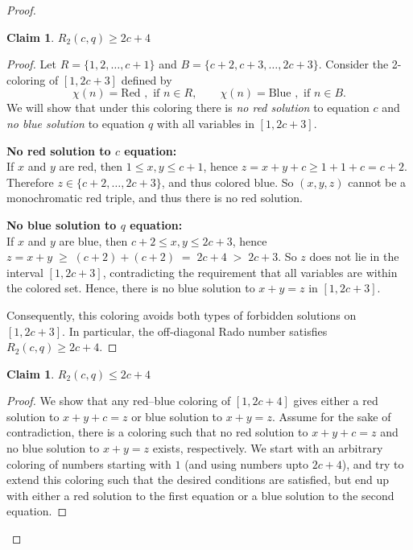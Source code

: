 \documentclass[preprint,12pt]{elsarticle}
\theoremstyle{plain}
\theoremstyle{definition}
\newtheorem{claim}[thm]{Claim}
\begin{document}
\begin{proof}
\begin{claim}\label{clm3.1}
    $R_2(c,q) \geq 2c+4$
\end{claim}
\begin{proof} Let $R = \{1,2,\dots,c+1\}$ and $B = \{c+2,c+3,\dots,2c+3\}$. Consider the 2-coloring of $[1,2c+3]$ defined by
$$
\chi(n) = \text{Red }, \text{ if $n \in R$},
\qquad
\chi(n) = \text{Blue }, \text{ if $n \in B$}.
$$
We will show that under this coloring there is
\emph{no red solution} to equation $c$ and \emph{no blue solution} to equation $q$ with all variables in $[1,2c+3]$.

\smallskip
\noindent\textbf{No red solution to $c$ equation:}\\
If $x$ and $y$ are red, then $1\le x,y\le c+1$, hence $z=x+y+c \ge 1+1+c = c+2$. Therefore $z\in\{c+2,\dots,2c+3\}$, and thus colored blue. So $(x,y,z)$ cannot be a monochromatic red triple, and thus there is no red solution.

\smallskip
\noindent\textbf{No blue solution to $q$ equation:}\\
If $x$ and $y$ are blue, then $c+2\le x,y\le 2c+3$, hence $z=x+y \;\ge\; (c+2)+(c+2) \;=\; 2c+4 \;>\; 2c+3$.
So $z$ does not lie in the interval $[1,2c+3]$, contradicting the requirement that all variables are within the colored set. Hence, there is no blue solution to $x+y=z$ in $[1,2c+3]$.

\smallskip
\noindent
Consequently, this coloring avoids both types of forbidden solutions on $[1,2c+3]$. In particular, the off-diagonal Rado number satisfies $R_2(c,q)\ge 2c+4$.\end{proof}

\begin{claim}\label{clm3.2}
    $R_2(c,q) \leq 2c+4$
\end{claim}
\begin{proof}We show that any red--blue coloring of $[1,2c+4]$ gives either a red solution to $x+y+c=z$ or blue solution to $x+y=z$. Assume for the sake of contradiction, there is a coloring such that no red solution to $x+y+c=z$ and no blue solution to $x+y=z$ exists, respectively. We start with an arbitrary coloring of numbers starting with $1$ (and using numbers upto $2c+4$), and try to extend this coloring such that the desired conditions are satisfied, but end up with either a red solution to the first equation or a blue solution to the second equation. 
\vspace{2mm}


\end{proof}
\end{proof}
\end{document}
